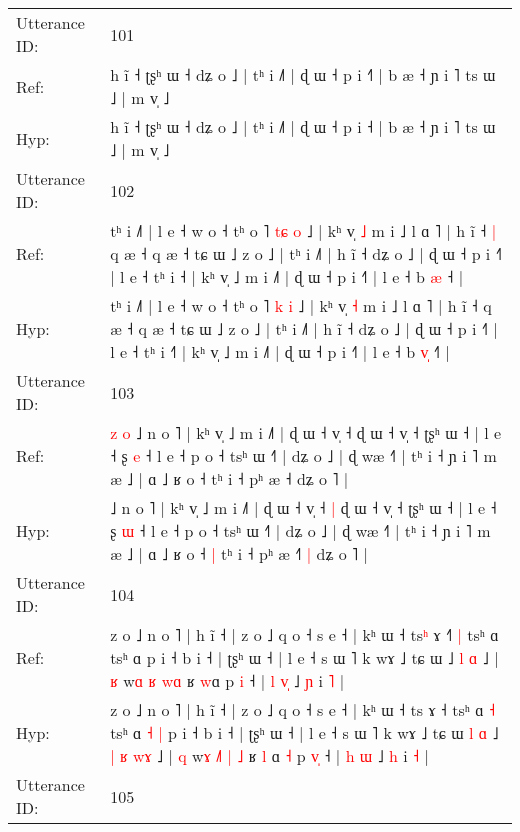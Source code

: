 \documentclass[10pt]{article}
\DeclareRobustCommand{\hl}[1]{{\textcolor{red}{#1}}}
\begin{document}
\begin{longtable}{ll}
 \\
\midrule
Utterance ID: & 101 \\
Ref: & h ĩ ˧ ʈʂʰ ɯ ˧ dʑ o ˩ | tʰ i ˩˥ | ɖ ɯ ˧ p i ˧\hl{˥} | b æ ˧ ɲ i ˥ ts ɯ ˩ | m v̩ ˩
 \\
Hyp: & h ĩ ˧ ʈʂʰ ɯ ˧ dʑ o ˩ | tʰ i ˩˥ | ɖ ɯ ˧ p i ˧\hl{} | b æ ˧ ɲ i ˥ ts ɯ ˩ | m v̩ ˩
 \\
\midrule
Utterance ID: & 102 \\
Ref: & tʰ i ˩˥ | l e ˧ w o ˧ tʰ o ˥ \hl{t}\hl{ɕ} \hl{o} ˩ | kʰ v̩ \hl{˩} m i ˩ l ɑ ˥ | h ĩ ˧\hl{ }\hl{|} q æ ˧ q æ ˧ tɕ ɯ ˩ z o ˩ | tʰ i ˩˥ | h ĩ ˧ dʑ o ˩ | ɖ ɯ ˧ p i ˧˥ | l e ˧ tʰ i ˧\hl{} | kʰ v̩ ˩ m i ˩˥ | ɖ ɯ ˧ p i ˧˥ | l e ˧ b \hl{}\hl{æ} ˧\hl{} |
 \\
Hyp: & tʰ i ˩˥ | l e ˧ w o ˧ tʰ o ˥ \hl{}\hl{k} \hl{i} ˩ | kʰ v̩ \hl{˧} m i ˩ l ɑ ˥ | h ĩ ˧\hl{}\hl{} q æ ˧ q æ ˧ tɕ ɯ ˩ z o ˩ | tʰ i ˩˥ | h ĩ ˧ dʑ o ˩ | ɖ ɯ ˧ p i ˧˥ | l e ˧ tʰ i ˧\hl{˥} | kʰ v̩ ˩ m i ˩˥ | ɖ ɯ ˧ p i ˧˥ | l e ˧ b \hl{v}\hl{̩} ˧\hl{˥} |
 \\
\midrule
Utterance ID: & 103 \\
Ref: & \hl{z}\hl{ }\hl{o}\hl{ }˩ n o ˥ | kʰ v̩ ˩ m i ˩˥ | ɖ ɯ ˧ v̩ ˧\hl{}\hl{} ɖ ɯ ˧ v̩ ˧ ʈʂʰ ɯ ˧ | l e ˧ ʂ \hl{e} ˧ l e ˧ p o ˧ tsʰ ɯ ˧˥ | dʑ o ˩ | ɖ wæ ˧˥ | tʰ i ˧ ɲ i ˥ m æ ˩ | ɑ ˩ ʁ o ˧\hl{}\hl{} tʰ i ˧ pʰ æ ˧\hl{}\hl{}\hl{} dʑ o ˥ |
 \\
Hyp: & \hl{}\hl{}\hl{}\hl{}˩ n o ˥ | kʰ v̩ ˩ m i ˩˥ | ɖ ɯ ˧ v̩ ˧\hl{ }\hl{|} ɖ ɯ ˧ v̩ ˧ ʈʂʰ ɯ ˧ | l e ˧ ʂ \hl{ɯ} ˧ l e ˧ p o ˧ tsʰ ɯ ˧˥ | dʑ o ˩ | ɖ wæ ˧˥ | tʰ i ˧ ɲ i ˥ m æ ˩ | ɑ ˩ ʁ o ˧\hl{ }\hl{|} tʰ i ˧ pʰ æ ˧\hl{˥}\hl{ }\hl{|} dʑ o ˥ |
 \\
\midrule
Utterance ID: & 104 \\
Ref: & z o ˩ n o ˥ | h ĩ ˧ | z o ˩ q o ˧ s e ˧ | kʰ ɯ ˧ ts\hl{ʰ} ɤ ˧\hl{˥}\hl{ }\hl{|} tsʰ ɑ\hl{}\hl{} tsʰ ɑ\hl{}\hl{}\hl{}\hl{} p i ˧ b i ˧ | ʈʂʰ ɯ ˧ | l e ˧ s ɯ ˥ k wɤ ˩ tɕ ɯ\hl{}\hl{}\hl{}\hl{} ˩\hl{}\hl{} \hl{l} \hl{}\hl{ɑ} ˩ | \hl{ʁ} w\hl{ɑ} \hl{}\hl{ʁ} \hl{}\hl{w}\hl{ɑ} ʁ \hl{}\hl{w}ɑ\hl{}\hl{} p \hl{}\hl{i} ˧ | \hl{l} \hl{v}\hl{̩} ˩ \hl{ɲ} i \hl{˥} |
 \\
Hyp: & z o ˩ n o ˥ | h ĩ ˧ | z o ˩ q o ˧ s e ˧ | kʰ ɯ ˧ ts\hl{} ɤ ˧\hl{}\hl{}\hl{} tsʰ ɑ\hl{ }\hl{˧} tsʰ ɑ\hl{ }\hl{˧}\hl{ }\hl{|} p i ˧ b i ˧ | ʈʂʰ ɯ ˧ | l e ˧ s ɯ ˥ k wɤ ˩ tɕ ɯ\hl{ }\hl{l}\hl{ }\hl{ɑ} ˩\hl{ }\hl{|} \hl{ʁ} \hl{w}\hl{ɤ} ˩ | \hl{q} w\hl{ɤ} \hl{˩}\hl{˥} \hl{|}\hl{ }\hl{˩} ʁ \hl{l}\hl{ }ɑ\hl{ }\hl{˧} p \hl{v}\hl{̩} ˧ | \hl{h} \hl{}\hl{ɯ} ˩ \hl{h} i \hl{˧} |
 \\
\midrule
Utterance ID: & 105 \\

\end{longtable}
\end{document}
